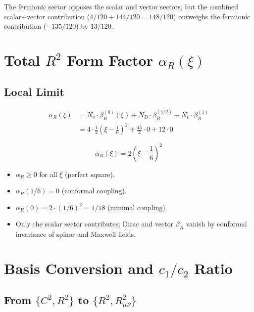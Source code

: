 \documentclass[11pt,a4paper]{article}
\begin{document}
The fermionic sector opposes the scalar and vector sectors, but the combined
scalar+vector contribution ($4/120 + 144/120 = 148/120$) outweighs the
fermionic contribution ($-135/120$) by $13/120$.

\section{Total $R^2$ Form Factor $\alpha_R(\xi)$}

\subsection{Local Limit}

\begin{align}
  \alpha_R(\xi) &= N_s \cdot \beta_R^{(0)}(\xi) + N_D \cdot \beta_R^{(1/2)} + N_v \cdot \beta_R^{(1)} \nonumber \\
  &= 4 \cdot \frac{1}{2}\!\left(\xi - \frac{1}{6}\right)^{\!2} + \frac{45}{2} \cdot 0 + 12 \cdot 0
\end{align}

\begin{equation}
  \boxed{\alpha_R(\xi) = 2\!\left(\xi - \frac{1}{6}\right)^{\!2}}
  \label{eq:alphaR}
\end{equation}

\begin{itemize}
  \item $\alpha_R \geq 0$ for all $\xi$ (perfect square).
  \item $\alpha_R(1/6) = 0$ (conformal coupling).
  \item $\alpha_R(0) = 2 \cdot (1/6)^2 = 1/18$ (minimal coupling).
  \item Only the scalar sector contributes; Dirac and vector $\beta_R$ vanish
        by conformal invariance of spinor and Maxwell fields.
\end{itemize}

\section{Basis Conversion and $c_1/c_2$ Ratio}

\subsection{From $\{C^2, R^2\}$ to $\{R^2, R_{\mu\nu}^2\}$}
\end{document}

